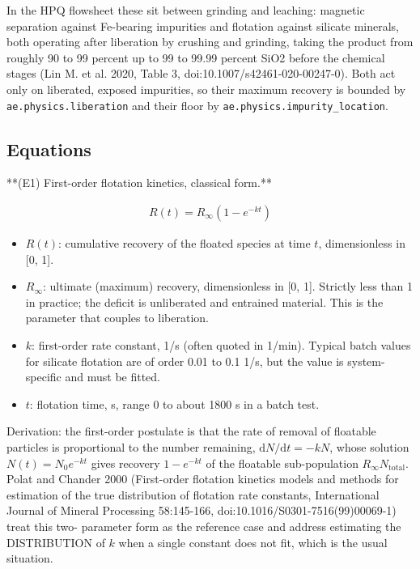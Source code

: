 \documentclass[10pt,a4paper,twoside]{report}
\begin{document}
In the HPQ flowsheet these sit between grinding and leaching: magnetic separation against Fe-bearing impurities and flotation against silicate minerals, both operating after liberation by crushing and grinding, taking the product from roughly 90 to 99 percent up to 99 to 99.99 percent SiO2 before the chemical stages (Lin M. et al. 2020, Table 3, doi:10.1007/s42461-020-00247-0). Both act only on liberated, exposed impurities, so their maximum recovery is bounded by \texttt{ae.physics.liberation} and their floor by \texttt{ae.physics.impurity\_location}.

\subsection*{Equations}

**(E1) First-order flotation kinetics, classical form.**

\begin{equation*}
\begin{gathered}
R(t) = R_{\infty} \left( 1 - e^{-k t} \right)
\end{gathered}
\end{equation*}

\begin{itemize}
\item $R(t)$: cumulative recovery of the floated species at time $t$, dimensionless in [0, 1].
\item $R_{\infty}$: ultimate (maximum) recovery, dimensionless in [0, 1]. Strictly less than 1 in practice; the deficit is unliberated and entrained material. This is the parameter that couples to liberation.
\item $k$: first-order rate constant, 1/s (often quoted in 1/min). Typical batch values for silicate flotation are of order 0.01 to 0.1 1/s, but the value is system-specific and must be fitted.
\item $t$: flotation time, s, range 0 to about 1800 s in a batch test.
\end{itemize}

Derivation: the first-order postulate is that the rate of removal of floatable particles is proportional to the number remaining, $\mathrm{d}N/\mathrm{d}t = -kN$, whose solution $N(t) = N_0 e^{-kt}$ gives recovery $1 - e^{-kt}$ of the floatable sub-population $R_{\infty} N_{\text{total}}$. Polat and Chander 2000 (First-order flotation kinetics models and methods for estimation of the true distribution of flotation rate constants, International Journal of Mineral Processing 58:145-166, doi:10.1016/S0301-7516(99)00069-1) treat this two- parameter form as the reference case and address estimating the DISTRIBUTION of $k$ when a single constant does not fit, which is the usual situation.
\end{document}

